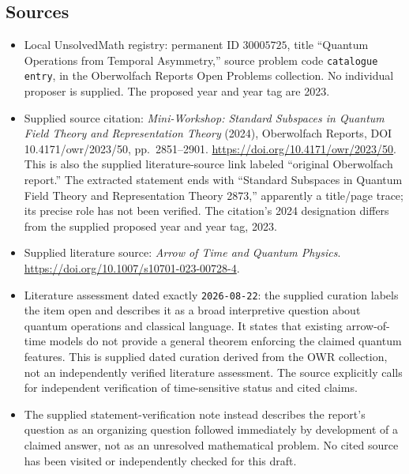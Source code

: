 \documentclass[11pt]{article}
\begin{document}
\subsection{Sources}
\begin{itemize}
\item Local UnsolvedMath registry: permanent ID \(30005725\), title ``Quantum Operations from Temporal Asymmetry,'' source problem code \texttt{catalogue entry}, in the Oberwolfach Reports Open Problems collection. No individual proposer is supplied. The proposed year and year tag are 2023.
\item Supplied source citation: \emph{Mini-Workshop: Standard Subspaces in Quantum Field Theory and Representation Theory} (2024), Oberwolfach Reports, DOI 10.4171/owr/2023/50, pp.~2851--2901. \url{https://doi.org/10.4171/owr/2023/50}. This is also the supplied literature-source link labeled ``original Oberwolfach report.'' The extracted statement ends with ``Standard Subspaces in Quantum Field Theory and Representation Theory 2873,'' apparently a title/page trace; its precise role has not been verified. The citation's 2024 designation differs from the supplied proposed year and year tag, 2023.
\item Supplied literature source: \emph{Arrow of Time and Quantum Physics}. \url{https://doi.org/10.1007/s10701-023-00728-4}.
\item Literature assessment dated exactly \texttt{2026-08-22}: the supplied curation labels the item open and describes it as a broad interpretive question about quantum operations and classical language. It states that existing arrow-of-time models do not provide a general theorem enforcing the claimed quantum features. This is supplied dated curation derived from the OWR collection, not an independently verified literature assessment. The source explicitly calls for independent verification of time-sensitive status and cited claims.
\item The supplied statement-verification note instead describes the report's question as an organizing question followed immediately by development of a claimed answer, not as an unresolved mathematical problem. No cited source has been visited or independently checked for this draft.
\end{itemize}
\end{document}
